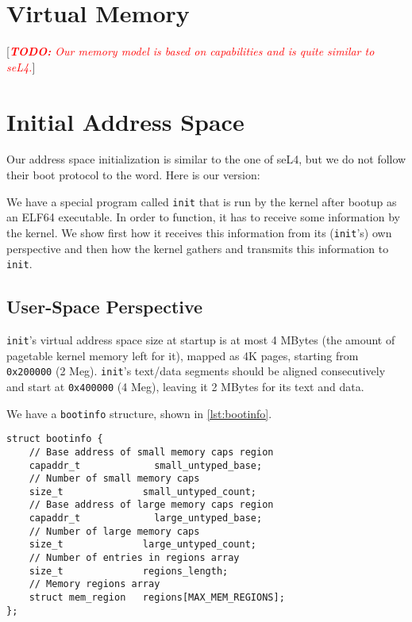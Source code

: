 \documentclass{scrreprt}
\newcommand{\note}[1]{ [\textcolor{red}{\emph{#1}}]}
\newcommand{\todo}[1]{\note{\textbf{TODO:} #1}}
\begin{document}
  \section{Virtual Memory}

  \todo{Our memory model is based on capabilities and is quite similar to seL4.}

  \section{Initial Address Space}

  Our address space initialization is similar to the one of seL4, but
  we do not follow their boot protocol to the word. Here is our
  version:

  We have a special program called \lstinline+init+ that is run by the kernel
  after bootup as an ELF64 executable. In order to function, it has to
  receive some information by the kernel. We show first how it
  receives this information from its (\lstinline+init+'s) own perspective and
  then how the kernel gathers and transmits this information to
  \lstinline+init+.

  \subsection{User-Space Perspective}

  \lstinline+init+'s virtual address space size at startup is at most 4 MBytes
  (the amount of pagetable kernel memory left for it), mapped as 4K
  pages, starting from \lstinline+0x200000+ (2 Meg). \lstinline+init+'s text/data segments
  should be aligned consecutively and start at \lstinline+0x400000+ (4 Meg),
  leaving it 2 MBytes for its text and data.

  We have a \lstinline+bootinfo+ structure, shown in \autoref{lst:bootinfo}.

\begin{lstlisting}[float,caption={\lstinline+bootinfo+ structure},
  label=lst:bootinfo]
struct bootinfo {
    // Base address of small memory caps region
    capaddr_t             small_untyped_base;
    // Number of small memory caps
    size_t              small_untyped_count;
    // Base address of large memory caps region
    capaddr_t             large_untyped_base;
    // Number of large memory caps
    size_t              large_untyped_count;
    // Number of entries in regions array
    size_t              regions_length;
    // Memory regions array
    struct mem_region   regions[MAX_MEM_REGIONS];
};
\end{lstlisting}
\end{document}
